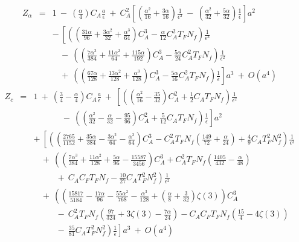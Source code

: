 \documentclass[a4paper,11pt]{article}
\newcommand{\Nf}{N_{\!f}}
\begin{document}
\begin{eqnarray} 
Z_\alpha &=& 1 ~-~ \left( \frac{\alpha}{4} \right) C_A \frac{a}{\epsilon} ~+~ 
C_A^2 \left[ \left( \frac{\alpha^2}{16} + \frac{3\alpha}{16} 
\right) \frac{1}{\epsilon^2} ~-~ \left( \frac{\alpha^2}{32} 
+ \frac{5\alpha}{32} \right) \frac{1}{\epsilon} \right] a^2 
\nonumber \\ 
&& -~ \left[ \left( \left( \frac{31\alpha}{96} + \frac{3\alpha^2}{32} 
+ \frac{\alpha^3}{64} \right) C_A^3 - \frac{\alpha}{12} C_A^2 T_F\Nf \right) 
\frac{1}{\epsilon^3} \right. \nonumber \\
&& \left. ~~~~-~ \left( \left( \frac{7\alpha^3}{384} + \frac{11\alpha^2}{64} 
+ \frac{115\alpha}{192} \right) C_A^3 - \frac{5\alpha}{24} C_A^2 T_F\Nf 
\right) \frac{1}{\epsilon^2} \right. \nonumber \\
&& \left. ~~~~+~ \left( \left( \frac{67\alpha}{128} + \frac{13\alpha^2}{128}
+ \frac{\alpha^3}{128} \right) C_A^3 - \frac{5\alpha}{16} C_A^2 T_F\Nf \right) 
\frac{1}{\epsilon} \right] a^3 ~+~ O(a^4) 
\end{eqnarray} 
\begin{eqnarray} 
Z_c &=& 1 ~+~ \left( \frac{3}{4} - \frac{\alpha}{4} \right) C_A 
\frac{a}{\epsilon} ~+~ \left[ \left( \left( \frac{\alpha^2}{16} - \frac{35}{32}
\right) C_A^2 + \frac{1}{2} C_A T_F \Nf \right) \frac{1}{\epsilon^2} \right. 
\nonumber \\ 
&& \left. ~~~~~~~~~~~~~~~-~ \left( \left( \frac{\alpha^2}{32} 
- \frac{\alpha}{32} - \frac{95}{96} \right) C_A^2 + \frac{5}{12} C_A T_F \Nf 
\right) \frac{1}{\epsilon} \right] a^2 \nonumber \\ 
&& +~ \left[ \left( \left( \frac{2765}{1152} + \frac{35\alpha}{384} 
- \frac{3\alpha^2}{64} - \frac{\alpha^3}{64} \right) C_A^3 
- C_A^2 T_F\Nf \left( \frac{149}{72} + \frac{\alpha}{24} \right) 
+ \frac{4}{9} C_A T_F^2 \Nf^2 \right) \frac{1}{\epsilon^3} \right. \nonumber \\
&& \left. ~~~~+~ \left( \left( \frac{7\alpha^3}{384} + \frac{11\alpha^2}{128} 
+ \frac{5\alpha}{96} - \frac{15587}{3456} \right) C_A^3 
+ C_A^2 T_F\Nf \left( \frac{1405}{432} - \frac{\alpha}{48} \right) 
\right. \right. \nonumber \\
&& \left. \left. ~~~~~~~~~~~~+~ C_A C_F T_F \Nf 
- \frac{10}{27} C_A T_F^2 \Nf^2 \right) \frac{1}{\epsilon^2} \right. 
\nonumber \\
&& \left. ~~~~+~ \left( \left( \frac{15817}{5184} - \frac{17\alpha}{96} 
- \frac{55\alpha^2}{768} - \frac{\alpha^3}{128} + \left( \frac{\alpha}{8} 
+ \frac{3}{32} \right) \zeta(3) \right) C_A^3 \right. \right. \nonumber \\ 
&& \left. \left. ~~~~~~~~~~~~-~ C_A^2 T_F\Nf \left( \frac{97}{324} 
+ 3\zeta(3) - \frac{7\alpha}{24} \right) - C_A C_F T_F\Nf 
\left( \frac{15}{4} - 4\zeta(3) \right) \right. \right. \nonumber \\
&& \left. \left. ~~~~~~~~~~~~-~ \frac{35}{81} C_A T_F^2 \Nf^2 \right) 
\frac{1}{\epsilon} \right] a^3 ~+~ O(a^4) 
\end{eqnarray} 
\end{document}
